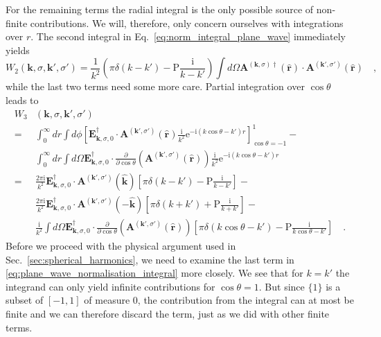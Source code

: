 \documentclass[10pt,letterpaper]{article}
\newcommand{\ii}{\text{i}}
\newcommand{\ee}{\text{e}}
\renewcommand{\vec}[1]{\mathbf{#1}}
\let\oldhat\hat
\renewcommand{\hat}[1]{\oldhat{\vec{#1}}}
\begin{document}
For the remaining terms the radial integral is the only possible source of non-finite contributions. We will, therefore, only concern ourselves with integrations over $r$. The second integral in Eq.~\eqref{eq:norm_integral_plane_wave} immediately yields
\begin{equation}
W_2(\vec{k}, \sigma, \vec{k'}, \sigma') = \frac{1}{k^2} \left(\pi\delta(k-k')-\text{P}\frac{\ii}{k-k'}\right)\int d\Omega \vec{A}^{(\vec{k},\sigma)\dagger}(\hat{r}) \cdot \vec{A}^{(\vec{k'},\sigma')}(\hat{r}) \quad ,
\end{equation}
while the last two terms need some more care. Partial integration over $\cos \theta$ leads to
\begin{align}
W_3&(\vec{k}, \sigma, \vec{k'}, \sigma') \nonumber \\ 
=& \int_0^\infty dr \int d\phi \left[\vec{E}^{\dagger}_{\vec{k},\sigma,0} \cdot \vec{A}^{(\vec{k'},\sigma')}(\hat{r})\frac{\ii}{k^2}\ee^{-\ii(k\cos\theta-k')r}\right]_{\cos\theta=-1}^1 - \nonumber \\
& \int_0^\infty dr \int d\Omega \vec{E}^{\dagger}_{\vec{k},\sigma,0} \cdot \frac{\partial}{\partial \cos\theta}\left(\vec{A}^{(\vec{k'},\sigma')}(\hat{r})\right)\frac{\ii}{k^2}\ee^{-\ii(k\cos\theta-k')r} \nonumber \\
=& \frac{2\pi\ii}{k^2} \vec{E}^{\dagger}_{\vec{k},\sigma,0} \cdot \vec{A}^{(\vec{k'},\sigma')}(\hat{k}) \left[\pi\delta(k-k')-\text{P}\frac{\ii}{k-k'}\right] - \nonumber \\
& \frac{2\pi\ii}{k^2} \vec{E}^{\dagger}_{\vec{k},\sigma,0} \cdot \vec{A}^{(\vec{k'},\sigma')}(-\hat{k}) \left[\pi\delta(k+k')+\text{P}\frac{\ii}{k+k'}\right] - \nonumber \\
& \frac{\ii}{k^2} \int d\Omega \vec{E}^{\dagger}_{\vec{k},\sigma,0} \cdot \frac{\partial}{\partial \cos\theta}\left(\vec{A}^{(\vec{k'},\sigma')}(\hat{r})\right) \left[\pi\delta(k\cos\theta-k')-\text{P}\frac{\ii}{k\cos\theta-k'}\right] \quad . \label{eq:plane_wave_normalisation_integral}
\end{align}
Before we proceed with the physical argument used in Sec.~\ref{sec:spherical_harmonics}, we need to examine the last term in \eqref{eq:plane_wave_normalisation_integral} more closely. We see that for $k=k'$ the integrand can only yield infinite contributions for $\cos\theta = 1$. But since $\{1\}$ is a subset of $[-1, 1]$ of measure $0$, the contribution from the integral can at most be finite and we can therefore discard the term, just as we did with other finite terms.
\end{document}
